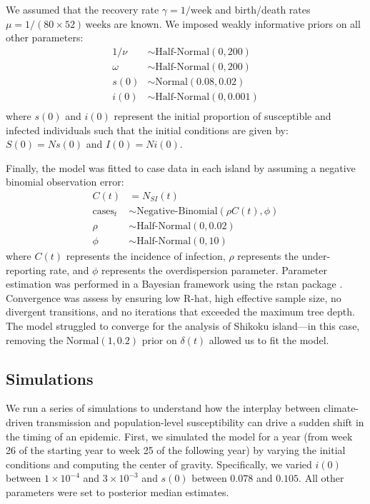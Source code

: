 \documentclass[12pt]{article}
\begin{document}
We assumed that the recovery rate $\gamma = 1/\mathrm{week}$ and birth/death rates $\mu = 1/(80\times 52)\,\mathrm{weeks}$ are known.
We imposed weakly informative priors on all other parameters:
\begin{align}
1/\nu &\sim \textrm{Half-Normal}(0, 200)\\
\omega &\sim \textrm{Half-Normal}(0, 200)\\
s(0) &\sim \textrm{Normal}(0.08, 0.02)\\
i(0) &\sim \textrm{Half-Normal}(0, 0.001)\\
\end{align}
where $s(0)$ and $i(0)$ represent the initial proportion of susceptible and infected individuals such that the initial conditions are given by: $S(0) = Ns(0)$ and $I(0) = N i(0)$.

Finally, the model was fitted to case data in each island by assuming a negative binomial observation error:
\begin{align}
C(t) &= N_{SI}(t)\\
\textrm{cases}_t &\sim \textrm{Negative-Binomial}(\rho C(t), \phi)\\
\rho &\sim \textrm{Half-Normal}(0, 0.02)\\
\phi &\sim \textrm{Half-Normal}(0, 10)
\end{align}
where $C(t)$ represents the incidence of infection, $\rho$ represents the under-reporting rate, and $\phi$ represents the overdispersion parameter.
Parameter estimation was performed in a Bayesian framework using the rstan package \citep{carpenter2017stan}.
Convergence was assess by ensuring low R-hat, high effective sample size, no divergent transitions, and no iterations that exceeded the maximum tree depth.
The model struggled to converge for the analysis of Shikoku island---in this case, removing the $\mathrm{Normal}(1, 0.2)$ prior on $\delta(t)$ allowed us to fit the model.

\subsection*{Simulations}

We run a series of simulations to understand how the interplay between climate-driven transmission and population-level susceptibility can drive a sudden shift in the timing of an epidemic.
First, we simulated the model for a year (from week 26 of the starting year to week 25 of the following year) by varying the initial conditions and computing the center of gravity.
Specifically, we varied $i(0)$ between $1\times 10^{-4}$ and $3\times 10^{-3}$ and $s(0)$ between $0.078$ and $0.105$.
All other parameters were set to posterior median estimates.
\end{document}
